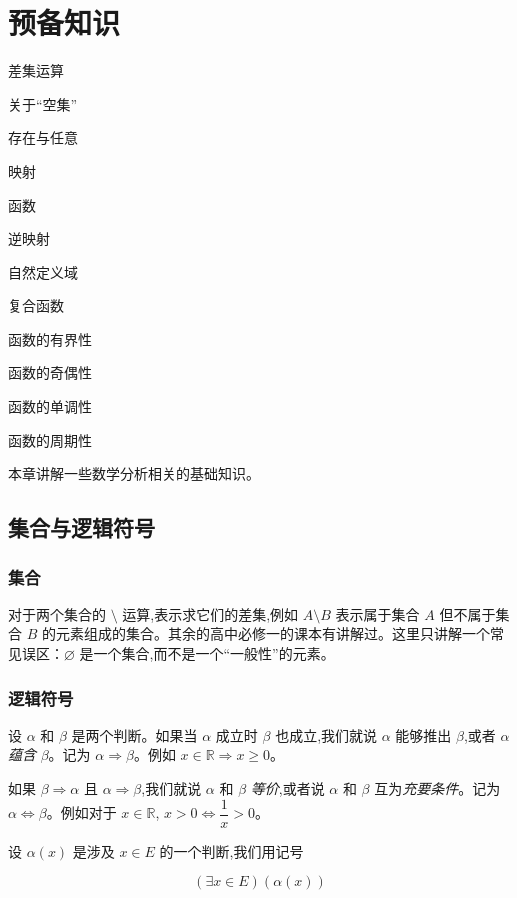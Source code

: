 \documentclass[lang=cn,10pt,twoside]{elegantbook}
\begin{document}
\chapter{预备知识}
\begin{introduction}
  \item 差集运算
  \item 关于“空集”
  \item 存在与任意
  \item 映射
  \item 函数
  \item 逆映射
  \item 自然定义域
  \item 复合函数
  \item 函数的有界性
  \item 函数的奇偶性
  \item 函数的单调性
  \item 函数的周期性
\end{introduction}
本章讲解一些数学分析相关的基础知识。

\section{集合与逻辑符号}

\subsection{集合}
对于两个集合的 $\setminus$ 运算,表示求它们的差集,例如 $A \setminus B$ 表示属于集合 $A$ 但不属于集合 $B$ 的元素组成的集合。其余的高中必修一的课本有讲解过。这里只讲解一个常见误区：$\varnothing$ 是一个集合,而不是一个“一般性”的元素。

\subsection{逻辑符号}
设 $\alpha$ 和 $\beta$ 是两个判断。如果当 $\alpha$ 成立时 $\beta$ 也成立,我们就说 $\alpha$ 能够推出 $\beta$,或者 $\alpha$ \emph{蕴含} $\beta$。记为 $\alpha \Rightarrow \beta$。例如 $x \in \mathbb{R} \Rightarrow x \geq 0$。

如果 $\beta\Rightarrow\alpha$ 且 $\alpha\Rightarrow\beta$,我们就说 $\alpha$ 和 $\beta$ \emph{等价},或者说 $\alpha$ 和 $\beta$ 互为\emph{充要条件}。记为 $\alpha \Leftrightarrow \beta$。例如对于 $x \in \mathbb{R}$, $x > 0 \Leftrightarrow \dfrac 1x > 0$。

设 $\alpha(x)$ 是涉及 $x \in E$ 的一个判断,我们用记号

\begin{equation*}
  (\exists x \in E)(\alpha(x))
\end{equation*}
\end{document}
